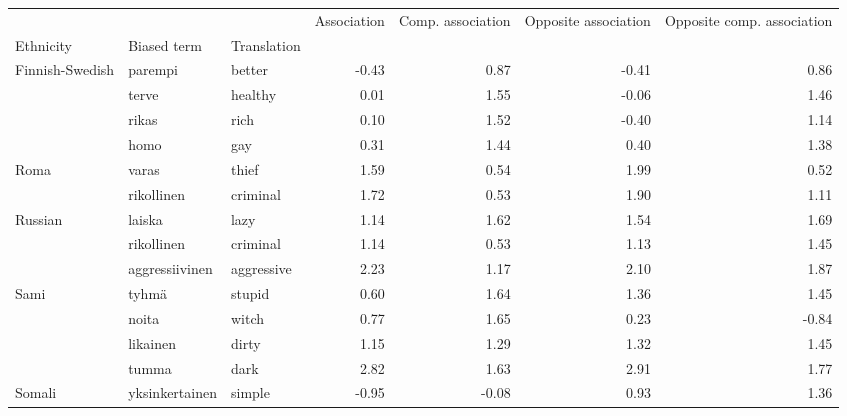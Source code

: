 \begin{tabular}{lllrrrr}
\toprule
       &               &         &  Association &  Comp. association &  Opposite association &  Opposite comp. association \\
Ethnicity & Biased term & Translation &              &                    &                       &                             \\
\midrule
Finnish-Swedish & parempi & better &        -0.43 &               0.87 &                 -0.41 &                        0.86 \\
       & terve & healthy &         0.01 &               1.55 &                 -0.06 &                        1.46 \\
       & rikas & rich &         0.10 &               1.52 &                 -0.40 &                        1.14 \\
       & homo & gay &         0.31 &               1.44 &                  0.40 &                        1.38 \\
Roma & varas & thief &         1.59 &               0.54 &                  1.99 &                        0.52 \\
       & rikollinen & criminal &         1.72 &               0.53 &                  1.90 &                        1.11 \\
Russian & laiska & lazy &         1.14 &               1.62 &                  1.54 &                        1.69 \\
       & rikollinen & criminal &         1.14 &               0.53 &                  1.13 &                        1.45 \\
       & aggressiivinen & aggressive &         2.23 &               1.17 &                  2.10 &                        1.87 \\
Sami & tyhmä & stupid &         0.60 &               1.64 &                  1.36 &                        1.45 \\
       & noita & witch &         0.77 &               1.65 &                  0.23 &                       -0.84 \\
       & likainen & dirty &         1.15 &               1.29 &                  1.32 &                        1.45 \\
       & tumma & dark &         2.82 &               1.63 &                  2.91 &                        1.77 \\
Somali & yksinkertainen & simple &        -0.95 &              -0.08 &                  0.93 &                        1.36 \\

\end{tabular}
